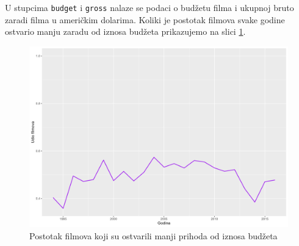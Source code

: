 	 U stupcima \texttt{budget} i \texttt{gross} nalaze se podaci o budžetu filma i ukupnoj bruto zaradi filma u američkim dolarima. Koliki je postotak filmova svake godine ostvario manju zaradu od iznosa budžeta prikazujemo na slici \ref{neuspjesno}.
	 
	 
	 \begin{figure}[H]
	 	\centering
	 	\includegraphics[width=15cm]{../figures/analysis/prihod_manji_od_budzeta.png}
	 	\caption{Postotak filmova koji su ostvarili manji prihoda od iznosa budžeta}
	 	\label{neuspjesno}
	 \end{figure}
	 
	 
	 
	 
	 
	 
	 
	 
	 
	 
	\eject